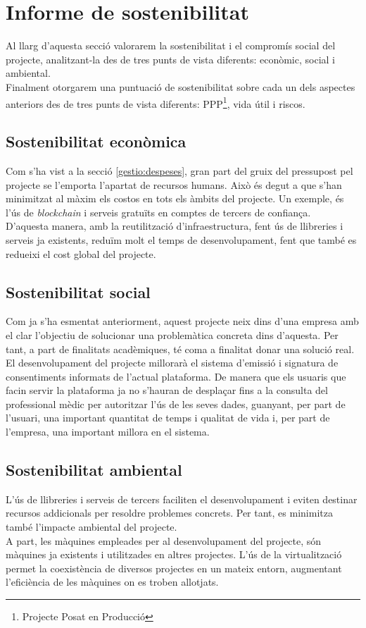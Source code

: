 \section{Informe de sostenibilitat}
\label{gestio:informe_sostenibilitat}
Al llarg d'aquesta secció valorarem la sostenibilitat i el compromís social del projecte, analitzant-la des de tres punts de vista diferents: econòmic, social i ambiental.\\
Finalment otorgarem una puntuació de sostenibilitat sobre cada un dels aspectes anteriors des de tres punts de vista diferents: PPP\footnote{Projecte Posat en Producció}, vida útil i riscos.
\subsection{Sostenibilitat econòmica}
Com s'ha vist a la secció \ref{gestio:despeses}, gran part del gruix del pressupost pel projecte se l'emporta l'apartat de recursos humans. Això és degut a que s'han minimitzat al màxim els costos en tots els àmbits del projecte. Un exemple, és l'ús de \textit{blockchain} i serveis gratuïts en comptes de tercers de confiança.\\
\newline D'aquesta manera, amb la reutilització d'infraestructura, fent ús de llibreries i serveis ja existents, reduïm molt el temps de desenvolupament, fent que també es redueixi el cost global del projecte.
\subsection{Sostenibilitat social}
Com ja s'ha esmentat anteriorment, aquest projecte neix dins d'una empresa amb el clar l'objectiu de solucionar una problemàtica concreta dins d'aquesta. Per tant, a part de finalitats acadèmiques, té coma a finalitat donar una solució real.\\
\newline El desenvolupament del projecte millorarà el sistema d'emissió i signatura de consentiments informats de l'actual plataforma. De manera que els usuaris que facin servir la plataforma ja no s'hauran de desplaçar fins a la consulta del professional mèdic per autoritzar l'ús de les seves dades, guanyant, per part de l'usuari, una important quantitat de temps i qualitat de vida i, per part de l'empresa, una important millora en el sistema.
\subsection{Sostenibilitat ambiental}
L'ús de llibreries i serveis de tercers faciliten el desenvolupament i eviten destinar recursos addicionals per resoldre problemes concrets. Per tant, es minimitza també l'impacte ambiental del projecte.\\
\newline  A part, les màquines empleades per al desenvolupament del projecte, són màquines ja existents i utilitzades en altres projectes. L'ús de la virtualització permet la coexistència de diversos projectes en un mateix entorn, augmentant l'eficiència de les màquines on es troben allotjats.
\clearpage
